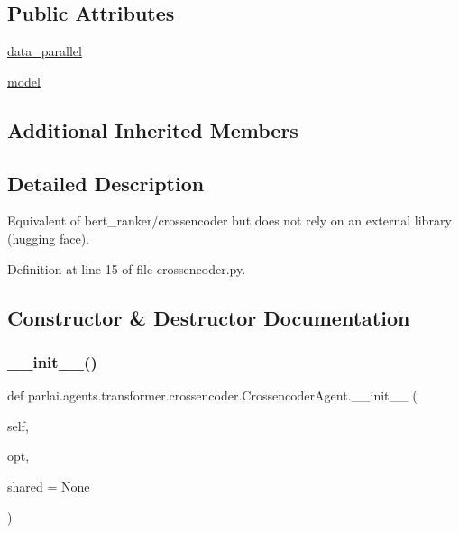\subsection*{Public Attributes}
\begin{DoxyCompactItemize}
\item 
\hyperlink{classparlai_1_1agents_1_1transformer_1_1crossencoder_1_1CrossencoderAgent_a991c76bbbb234ba482e3eaf3b6813bc8}{data\+\_\+parallel}
\item 
\hyperlink{classparlai_1_1agents_1_1transformer_1_1crossencoder_1_1CrossencoderAgent_a53447e9640405f06d1458eec65db5525}{model}
\end{DoxyCompactItemize}
\subsection*{Additional Inherited Members}


\subsection{Detailed Description}
\begin{DoxyVerb}Equivalent of bert_ranker/crossencoder but does not rely on an external library
(hugging face).
\end{DoxyVerb}
 

Definition at line 15 of file crossencoder.\+py.



\subsection{Constructor \& Destructor Documentation}
\mbox{\label{classparlai_1_1agents_1_1transformer_1_1crossencoder_1_1CrossencoderAgent_a22295a739ff290d96c45efd0bfd550bb}} 
\subsubsection{\texorpdfstring{\+\_\+\+\_\+init\+\_\+\+\_\+()}{\_\_init\_\_()}}
{\footnotesize\ttfamily def parlai.\+agents.\+transformer.\+crossencoder.\+Crossencoder\+Agent.\+\_\+\+\_\+init\+\_\+\+\_\+ (\begin{DoxyParamCaption}\item[{}]{self,  }\item[{}]{opt,  }\item[{}]{shared = {\ttfamily None} }\end{DoxyParamCaption})}



